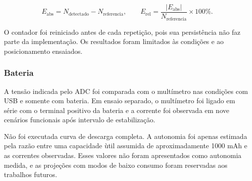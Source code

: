 \documentclass[a4paper,12pt]{article}
\begin{document}
\[
E_{\mathrm{abs}}=N_{\mathrm{detectado}}-N_{\mathrm{referencia}},
\qquad
E_{\mathrm{rel}}=\frac{|E_{\mathrm{abs}}|}{N_{\mathrm{referencia}}}\times 100\%.
\]


O contador foi reiniciado antes de cada repeti\c{c}\~ao, pois sua persist\^encia n\~ao faz parte da implementa\c{c}\~ao. Os resultados foram limitados \`as condi\c{c}\~oes e ao posicionamento ensaiados.


\subsubsection{Bateria}

A tens\~ao indicada pelo ADC foi comparada com o mult\'imetro nas condi\c{c}\~oes com USB e somente com bateria. Em ensaio separado, o mult\'imetro foi ligado em s\'erie com o terminal positivo da bateria e a corrente foi observada em nove cen\'arios funcionais ap\'os intervalo de estabiliza\c{c}\~ao.

N\~ao foi executada curva de descarga completa. A autonomia foi apenas estimada pela raz\~ao entre uma capacidade \`util assumida de aproximadamente 1000 mAh e as correntes observadas. Esses valores n\~ao foram apresentados como autonomia medida, e as proje\c{c}\~oes com modos de baixo consumo foram reservadas aos trabalhos futuros.
\end{document}
